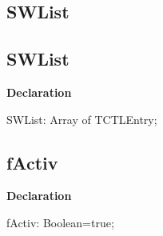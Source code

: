 \documentclass{report}
\newif\ifpdf
\begin{document}
\subsection*{\large{\textbf{SWList}}\normalsize\hspace{1ex}\hrulefill}
\else
\subsection*{SWList}
\fi
\label{swcatalog-SWList}
\begin{list}{}{
\setlength{\itemindent}{0cm}
\setlength{\listparindent}{0cm}
\setlength{\leftmargin}{\evensidemargin}
\addtolength{\leftmargin}{\tmplength}
\settowidth{\labelsep}{X}
\addtolength{\leftmargin}{\labelsep}
\setlength{\labelwidth}{\tmplength}
}
\item[\textbf{Declaration}\hfill]
\ifpdf
\begin{flushleft}
\fi
\begin{ttfamily}
SWList: Array of TCTLEntry;\end{ttfamily}

\ifpdf
\end{flushleft}
\fi

\end{list}
\ifpdf
\subsection*{\large{\textbf{fActiv}}\normalsize\hspace{1ex}\hrulefill}
\else
\subsection*{fActiv}
\fi
\label{swcatalog-fActiv}
\begin{list}{}{
\setlength{\itemindent}{0cm}
\setlength{\listparindent}{0cm}
\setlength{\leftmargin}{\evensidemargin}
\addtolength{\leftmargin}{\tmplength}
\settowidth{\labelsep}{X}
\addtolength{\leftmargin}{\labelsep}
\setlength{\labelwidth}{\tmplength}
}
\item[\textbf{Declaration}\hfill]
\ifpdf
\begin{flushleft}
\fi
\begin{ttfamily}
fActiv: Boolean=true;\end{ttfamily}

\ifpdf
\end{flushleft}
\fi

\end{list}
\end{document}
